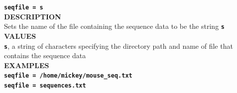 \documentclass[a4paper]{book}
\numberwithin{equation}{section} \renewcommand{\baselinestretch}{0.55}
\begin{document}
\textbf{{\Large \texttt{seqfile = s}}} \vspace{5pt} \\
\textbf{DESCRIPTION} \vspace{5pt}\\
Sets the name of the file containing the sequence data to be the string \textbf{\texttt{s}} \vspace{5pt}\\
\textbf{VALUES} \vspace{5pt}\\
\textbf{\texttt{s}}, a string of characters specifying the directory path and name of file that contains the sequence data \vspace{5pt}\\
\textbf{EXAMPLES} \vspace{5pt}\\
\textbf{\texttt{seqfile = /home/mickey/mouse\_seq.txt}} \vspace{5pt}\\
\textbf{\texttt{seqfile = sequences.txt}} \vspace{10pt}\\
\end{document}

